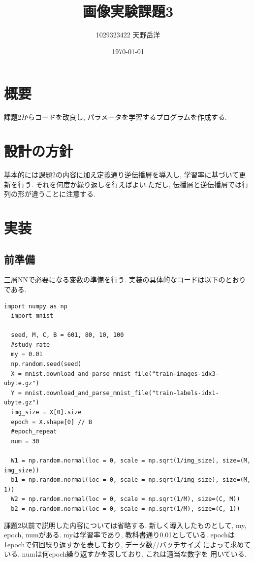 \documentclass[a4paper,11pt]{jsarticle}
\begin{document}
\title{画像実験課題3}
\author{1029323422 天野岳洋}
\date{\today}
\maketitle
\clearpage

\section{概要}
課題2からコードを改良し, パラメータを学習するプログラムを作成する.

\section{設計の方針}
基本的には課題2の内容に加え定義通り逆伝播層を導入し, 学習率に基づいて更新を行う.
それを何度か繰り返しを行えばよい.ただし,
伝播層と逆伝播層では行列の形が違うことに注意する.

\section{実装}
\subsection*{前準備}
三層NNで必要になる変数の準備を行う. 実装の具体的なコードは以下のとおりである.
\begin{lstlisting}[caption=前準備]
  import numpy as np
  import mnist

  seed, M, C, B = 601, 80, 10, 100
  #study_rate
  my = 0.01
  np.random.seed(seed)
  X = mnist.download_and_parse_mnist_file("train-images-idx3-ubyte.gz")
  Y = mnist.download_and_parse_mnist_file("train-labels-idx1-ubyte.gz")
  img_size = X[0].size
  epoch = X.shape[0] // B
  #epoch_repeat
  num = 30

  W1 = np.random.normal(loc = 0, scale = np.sqrt(1/img_size), size=(M, img_size))
  b1 = np.random.normal(loc = 0, scale = np.sqrt(1/img_size), size=(M, 1))
  W2 = np.random.normal(loc = 0, scale = np.sqrt(1/M), size=(C, M))
  b2 = np.random.normal(loc = 0, scale = np.sqrt(1/M), size=(C, 1))
\end{lstlisting}
\par
課題2以前で説明した内容については省略する.
新しく導入したものとして, my, epoch, numがある.
myは学習率であり, 教科書通り0.01としている.
epochは1epochで何回繰り返すかを表しており, データ数//バッチサイズ
によって求めている. numは何epoch繰り返すかを表しており, これは適当な数字を
用いている.
\end{document}
